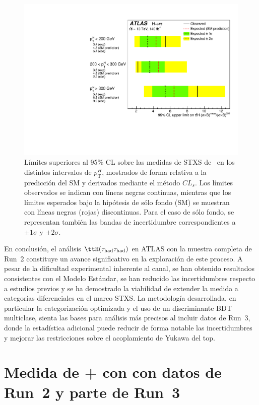 \begin{figure}[h]
  \centering
  \includegraphics[width=0.70\linewidth]{images/fit_stxs/fig_08.pdf} %
  \caption{Límites superiores al 95\% CL sobre las medidas de STXS de \ttH\ en los distintos intervalos de $p_{\mathrm{T}}^{H}$, mostrados de forma relativa a la predicción del SM y derivados mediante el método $CL_s$. Los límites observados se indican con líneas negras continuas, mientras que los límites esperados bajo la hipótesis de sólo fondo (SM) se muestran con líneas negras (rojas) discontinuas. Para el caso de sólo fondo, se representan también las bandas de incertidumbre correspondientes a $\pm 1\sigma$ y $\pm 2\sigma$.}
  \label{res:tth_cls_limits}
\end{figure}

En conclusión, el análisis \(\ttH(\tau_{\mathrm{had}}\tau_{\mathrm{had}})\) en ATLAS con la muestra completa de Run~2 constituye un avance significativo en la exploración de este proceso. A pesar de la dificultad experimental inherente al canal, se han obtenido resultados consistentes con el Modelo Estándar, se han reducido las incertidumbres respecto a estudios previos y se ha demostrado la viabilidad de extender la medida a categorías diferenciales en el marco STXS. La metodología desarrollada, en particular la categorización optimizada y el uso de un discriminante BDT multiclase, sienta las bases para análisis más precisos al incluir datos de Run~3, donde la estadística adicional puede reducir de forma notable las incertidumbres y mejorar las restricciones sobre el acoplamiento de Yukawa del top.

\FloatBarrier


\section*{Medida de \thqb + \ttH con \htautau con datos de Run~2 y parte de Run~3}

